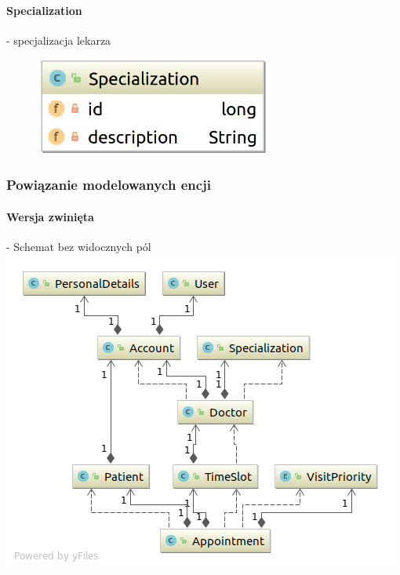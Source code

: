 \documentclass[polish,12pt]{aghthesis}
\begin{document}
    \paragraph{Specialization} - specjalizacja lekarza 
    \begin{figure}[H]
    \includegraphics[width=0.7\textwidth]{Specialization}
    \end{figure}
\subsubsection{Powiązanie modelowanych encji}
\paragraph{Wersja zwinięta} - Schemat bez widocznych pól
\includegraphics[width=\textwidth]{java-entities-small}
\end{document}
